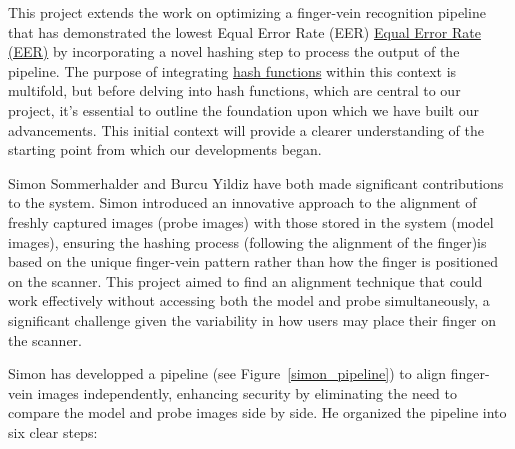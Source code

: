 This project extends the work on optimizing a finger-vein recognition pipeline that has demonstrated the lowest Equal Error Rate (EER) \hyperref[def:EER]{Equal Error Rate (EER)} by incorporating a novel hashing step to process the output of the pipeline. The purpose of integrating \hyperref[def:Hash_Function]{hash functions} within this context is multifold, but before delving into hash functions, which are central to our project, it's essential to outline the foundation upon which we have built our advancements. This initial context will provide a clearer understanding of the starting point from which our developments began.

Simon Sommerhalder and Burcu Yildiz have both made significant contributions to the system. Simon introduced an innovative approach to the alignment of freshly captured images (probe images) with those stored in the system (model images), ensuring the hashing process (following the alignment of the finger)is based on the unique finger-vein pattern rather than how the finger is positioned on the scanner. This project aimed to find an alignment technique that could work effectively without accessing both the model and probe simultaneously, a significant challenge given the variability in how users may place their finger on the scanner.

Simon has developped a pipeline (see Figure~\ref{simon_pipeline}) to align finger-vein images independently, enhancing security by eliminating the need to compare the model and probe images side by side. He organized the pipeline into six clear steps:

